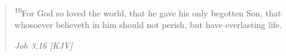 \begin{quote}
\textsuperscript{16}For God so loved the world, that he gave his only begotten Son, that whosoever believeth in him should not perish, but have everlasting life.
\begin{flushright}
\emph{Joh 3,16 [KJV]}
\end{flushright}
\end{quote}